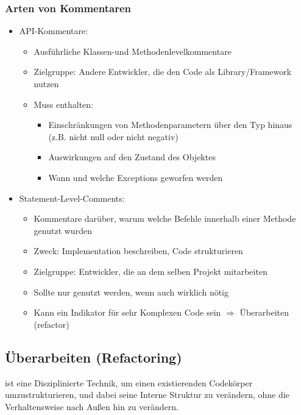 \documentclass[ngerman,color=3b]{tuda_summary}
\begin{document}
\subsubsection{Arten von Kommentaren}
\begin{itemize}
    \item API-Kommentare:\begin{itemize}
              \item Ausführliche Klassen-und Methodenlevelkommentare
              \item Zielgruppe: Andere Entwickler, die den Code als Library/Framework nutzen
              \item Muss enthalten:\begin{itemize}
                        \item Einschränkungen von Methodenparametern über den Typ hinaus (z.B. nicht null oder nicht negativ)
                        \item Auswirkungen auf den Zustand des Objektes
                        \item Wann und welche Exceptions geworfen werden
                    \end{itemize}
          \end{itemize}
    \item Statement-Level-Comments:\begin{itemize}
              \item Kommentare darüber, warum welche Befehle innerhalb einer Methode genutzt wurden
              \item Zweck: Implementation beschreiben, Code strukturieren
              \item Zielgruppe: Entwickler, die an dem selben Projekt mitarbeiten
              \item Sollte nur genutzt werden, wenn auch wirklich nötig
              \item Kann ein Indikator für sehr Komplexen Code sein $\Rightarrow$ Überarbeiten (refactor)
          \end{itemize}
\end{itemize}

\clearpage
\subsection{Überarbeiten (Refactoring)}
\begin{definition}[Refactoring]
    ist eine Disziplinierte Technik, um einen existierenden Codekörper umzustrukturieren, und dabei seine Interne Struktur zu verändern, ohne die Verhaltensweise nach Außen hin zu verändern.
\end{definition}
\end{document}
